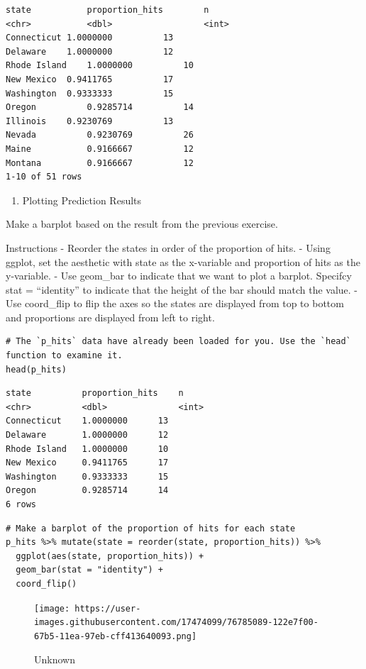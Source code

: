 \documentclass[
]{article}
\providecommand{\tightlist}{%
  \setlength{\itemsep}{0pt}\setlength{\parskip}{0pt}}
\begin{document}
\begin{verbatim}
state           proportion_hits        n
<chr>           <dbl>                  <int>
Connecticut 1.0000000          13
Delaware    1.0000000          12
Rhode Island    1.0000000          10
New Mexico  0.9411765          17
Washington  0.9333333          15
Oregon          0.9285714          14
Illinois    0.9230769          13
Nevada          0.9230769          26
Maine           0.9166667          12
Montana         0.9166667          12
1-10 of 51 rows
\end{verbatim}

\begin{enumerate}
\def\labelenumi{\arabic{enumi}.}
\setcounter{enumi}{4}
\tightlist
\item
  Plotting Prediction Results
\end{enumerate}

Make a barplot based on the result from the previous exercise.

Instructions - Reorder the states in order of the proportion of hits. -
Using ggplot, set the aesthetic with state as the x-variable and
proportion of hits as the y-variable. - Use geom\_bar to indicate that
we want to plot a barplot. Specifcy stat = ``identity'' to indicate that
the height of the bar should match the value. - Use coord\_flip to flip
the axes so the states are displayed from top to bottom and proportions
are displayed from left to right.

\begin{verbatim}
# The `p_hits` data have already been loaded for you. Use the `head` function to examine it.
head(p_hits)
\end{verbatim}

\begin{verbatim}
state          proportion_hits    n
<chr>          <dbl>              <int>
Connecticut    1.0000000      13
Delaware       1.0000000      12
Rhode Island   1.0000000      10
New Mexico     0.9411765      17
Washington     0.9333333      15
Oregon         0.9285714      14
6 rows
\end{verbatim}

\begin{verbatim}
# Make a barplot of the proportion of hits for each state
p_hits %>% mutate(state = reorder(state, proportion_hits)) %>%
  ggplot(aes(state, proportion_hits)) + 
  geom_bar(stat = "identity") +
  coord_flip()
\end{verbatim}

\begin{figure}
\centering
\texttt{[image: https://user-images.githubusercontent.com/17474099/76785089-122e7f00-67b5-11ea-97eb-cff413640093.png]}
\caption{Unknown}
\end{figure}
\end{document}
